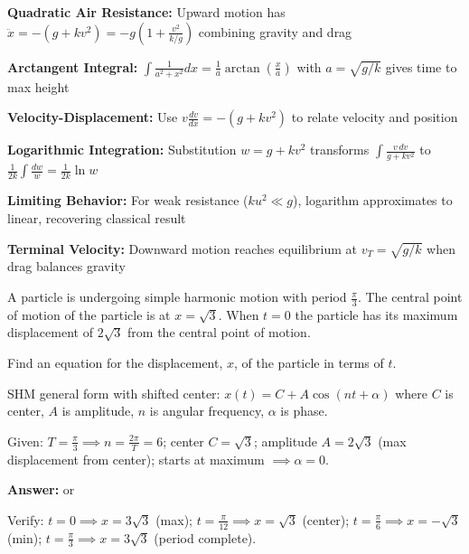 \begin{takeaways}
\item \textbf{Quadratic Air Resistance:} Upward motion has $\ddot{x} = -(g + kv^2) = -g(1 + \frac{v^2}{k/g})$ combining gravity and drag
\item \textbf{Arctangent Integral:} $\int \frac{1}{a^2+x^2}dx = \frac{1}{a}\arctan\left(\frac{x}{a}\right)$ with $a = \sqrt{g/k}$ gives time to max height
\item \textbf{Velocity-Displacement:} Use $v\frac{dv}{dx} = -(g+kv^2)$ to relate velocity and position
\item \textbf{Logarithmic Integration:} Substitution $w = g + kv^2$ transforms $\int \frac{v\,dv}{g+kv^2}$ to $\frac{1}{2k}\int \frac{dw}{w} = \frac{1}{2k}\ln w$
\item \textbf{Limiting Behavior:} For weak resistance ($ku^2 \ll g$), logarithm approximates to linear, recovering classical result
\item \textbf{Terminal Velocity:} Downward motion reaches equilibrium at $v_T = \sqrt{g/k}$ when drag balances gravity
\end{takeaways}

\newpage

\begin{problem}
A particle is undergoing simple harmonic motion with period $\frac{\pi}{3}$. The central point of motion of the particle is at $x = \sqrt{3}$. When $t = 0$ the particle has its maximum displacement of $2\sqrt{3}$ from the central point of motion.

\vspace{0.5cm}
\noindent Find an equation for the displacement, $x$, of the particle in terms of $t$.
\end{problem}

\begin{solution}
SHM general form with shifted center: $x(t) = C + A\cos(nt + \alpha)$ where $C$ is center, $A$ is amplitude, $n$ is angular frequency, $\alpha$ is phase.

Given: $T = \frac{\pi}{3} \implies n = \frac{2\pi}{T} = 6$; center $C = \sqrt{3}$; amplitude $A = 2\sqrt{3}$ (max displacement from center); starts at maximum $\implies \alpha = 0$.

\textbf{Answer:}  or 

Verify: $t=0 \implies x=3\sqrt{3}$ (max); $t=\frac{\pi}{12} \implies x=\sqrt{3}$ (center); $t=\frac{\pi}{6} \implies x=-\sqrt{3}$ (min); $t=\frac{\pi}{3} \implies x=3\sqrt{3}$ (period complete).
\end{solution}

